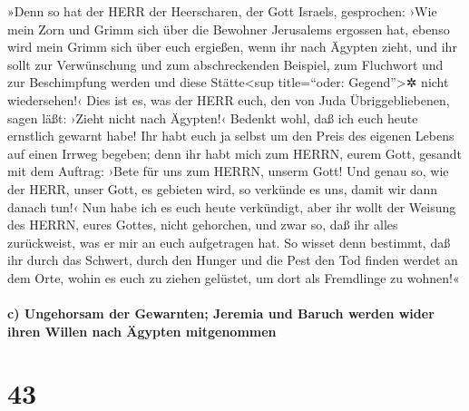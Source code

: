 »Denn so hat der HERR der Heerscharen, der Gott Israels,
gesprochen: ›Wie mein Zorn und Grimm sich über die Bewohner Jerusalems
ergossen hat, ebenso wird mein Grimm sich über euch ergießen, wenn ihr
nach Ägypten zieht, und ihr sollt zur Verwünschung und zum
abschreckenden Beispiel, zum Fluchwort und zur Beschimpfung werden und
diese Stätte\textless sup title=``oder: Gegend''\textgreater✲ nicht
wiedersehen!‹ Dies ist es, was der HERR euch, den von
Juda Übriggebliebenen, sagen läßt: ›Zieht nicht nach Ägypten!‹ Bedenkt
wohl, daß ich euch heute ernstlich gewarnt habe! Ihr habt
euch ja selbst um den Preis des eigenen Lebens auf einen Irrweg begeben;
denn ihr habt mich zum HERRN, eurem Gott, gesandt mit dem Auftrag: ›Bete
für uns zum HERRN, unserm Gott! Und genau so, wie der HERR, unser Gott,
es gebieten wird, so verkünde es uns, damit wir dann danach tun!‹
Nun habe ich es euch heute verkündigt, aber ihr wollt der
Weisung des HERRN, eures Gottes, nicht gehorchen, und zwar so, daß ihr
alles zurückweist, was er mir an euch aufgetragen hat. So
wisset denn bestimmt, daß ihr durch das Schwert, durch den Hunger und
die Pest den Tod finden werdet an dem Orte, wohin es euch zu ziehen
gelüstet, um dort als Fremdlinge zu wohnen!«

\hypertarget{c-ungehorsam-der-gewarnten-jeremia-und-baruch-werden-wider-ihren-willen-nach-uxe4gypten-mitgenommen}{%
\paragraph{c) Ungehorsam der Gewarnten; Jeremia und Baruch werden wider
ihren Willen nach Ägypten
mitgenommen}\label{c-ungehorsam-der-gewarnten-jeremia-und-baruch-werden-wider-ihren-willen-nach-uxe4gypten-mitgenommen}}

\hypertarget{section-42}{%
\section{43}\label{section-42}}

